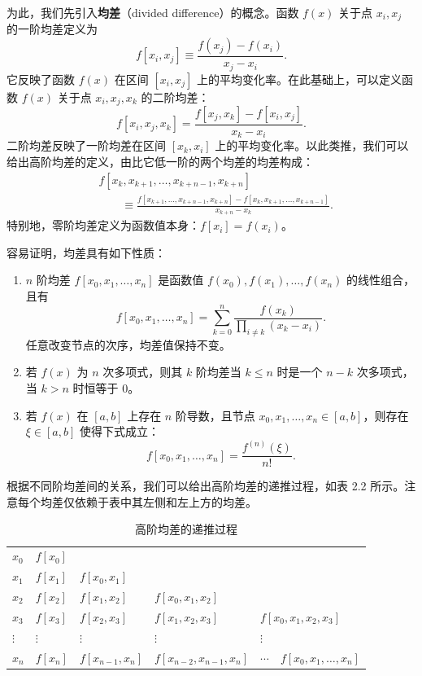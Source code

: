 为此，我们先引入\textbf{均差}（divided difference）的概念。函数 $f(x)$ 关于点 $x_i,x_j$ 的一阶均差定义为
\begin{equation}
 f[x_i,x_j]\equiv\frac{f(x_j)-f(x_i)}{x_j-x_i}.
\tag{2.1.6}
\end{equation}
它反映了函数 $f(x)$ 在区间 $[x_i,x_j]$ 上的平均变化率。在此基础上，可以定义函数 $f(x)$ 关于点 $x_i,x_j,x_k$ 的二阶均差：
\begin{equation}
 f[x_i,x_j,x_k]=\frac{f[x_j,x_k]-f[x_i,x_j]}{x_k-x_i}.
\tag{2.1.7}
\end{equation}
二阶均差反映了一阶均差在区间 $[x_k,x_i]$ 上的平均变化率。以此类推，我们可以给出高阶均差的定义，由比它低一阶的两个均差的均差构成：
\[
\begin{aligned}
&f[x_k,x_{k+1},\ldots,x_{k+n-1},x_{k+n}]\\
&\qquad\equiv\frac{f[x_{k+1},\ldots,x_{k+n-1},x_{k+n}]-f[x_k,x_{k+1},\ldots,x_{k+n-1}]}{x_{k+n}-x_k}.
\end{aligned}
\]
特别地，零阶均差定义为函数值本身：$f[x_i]=f(x_i)$。

容易证明，均差具有如下性质：
\begin{enumerate}
\item $n$ 阶均差 $f[x_0,x_1,\ldots,x_n]$ 是函数值 $f(x_0),f(x_1),\ldots,f(x_n)$ 的线性组合，且有
\begin{equation}
 f[x_0,x_1,\ldots,x_n]=\sum_{k=0}^{n}\frac{f(x_k)}{\displaystyle\prod_{i\ne k}(x_k-x_i)}.
\tag{2.1.8}
\end{equation}
任意改变节点的次序，均差值保持不变。
\item 若 $f(x)$ 为 $n$ 次多项式，则其 $k$ 阶均差当 $k\le n$ 时是一个 $n-k$ 次多项式，当 $k>n$ 时恒等于 0。
\item 若 $f(x)$ 在 $[a,b]$ 上存在 $n$ 阶导数，且节点 $x_0,x_1,\ldots,x_n\in[a,b]$，则存在 $\xi\in[a,b]$ 使得下式成立：
\begin{equation}
 f[x_0,x_1,\ldots,x_n]=\frac{f^{(n)}(\xi)}{n!}.
\tag{2.1.9}
\end{equation}
\end{enumerate}

根据不同阶均差间的关系，我们可以给出高阶均差的递推过程，如表 2.2 所示。注意每个均差仅依赖于表中其左侧和左上方的均差。

\begin{table}[htbp]
\centering
\caption{高阶均差的递推过程}
\label{tab:divided-differences}
\small
\begin{tabular}{lllll}
\toprule
$x_0$ & $f[x_0]$ \\
$x_1$ & $f[x_1]$ & $f[x_0,x_1]$ \\
$x_2$ & $f[x_2]$ & $f[x_1,x_2]$ & $f[x_0,x_1,x_2]$ \\
$x_3$ & $f[x_3]$ & $f[x_2,x_3]$ & $f[x_1,x_2,x_3]$ & $f[x_0,x_1,x_2,x_3]$ \\
$\vdots$ & $\vdots$ & $\vdots$ & $\vdots$ & $\vdots$\\
$x_n$ & $f[x_n]$ & $f[x_{n-1},x_n]$ & $f[x_{n-2},x_{n-1},x_n]$ & $\cdots\quad f[x_0,x_1,\ldots,x_n]$\\
\bottomrule
\end{tabular}
\end{table}

